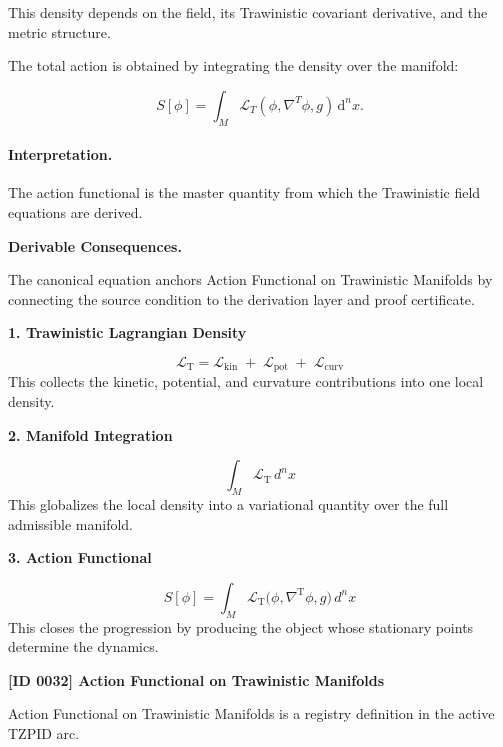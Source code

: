 This density depends on the field, its Trawinistic covariant derivative, and the metric structure.

The total action is obtained by integrating the density over the manifold:

\begin{equation}
\boxed{
S[\phi]
=
\int_M
\mathcal{L}_T
\left(
\phi,\nabla^T\phi,g
\right)
\,\mathrm{d}^n x .
}
\end{equation}

\paragraph{Interpretation.}
The action functional is the master quantity from which the Trawinistic field equations are derived.

\par\vspace{0.35em}
\noindent\textbf{Derivable Consequences.}\quad
\begingroup
\footnotesize
\raggedright
The canonical equation anchors Action Functional on Trawinistic Manifolds by connecting the source condition to the derivation layer and proof certificate.
\par\endgroup

\noindent\textbf{1. Trawinistic Lagrangian Density}\par
\[
\mathcal{L}_{\mathrm{T}}
=
\mathcal{L}_{\mathrm{kin}}
\;+\;
\mathcal{L}_{\mathrm{pot}}
\;+\;
\mathcal{L}_{\mathrm{curv}}
\]
\noindent This collects the kinetic, potential, and curvature contributions into one local density.\par
\noindent\textbf{2. Manifold Integration}\par
\[
\int_{M}\mathcal{L}_{\mathrm{T}}\,d^{n}x
\]
\noindent This globalizes the local density into a variational quantity over the full admissible manifold.\par
\noindent\textbf{3. Action Functional}\par
\[
S[\phi]
=
\int_{M}
\mathcal{L}_{\mathrm{T}}
\bigl(
\phi,\nabla^{\mathrm{T}}\phi,g
\bigr)\,
d^{n}x
\]
\noindent This closes the progression by producing the object whose stationary points determine the dynamics.\par

\clearpage
\noindent\textbf{[ID 0032] Action Functional on Trawinistic Manifolds}\par
\vspace{0.35em}
\begingroup\small
{}
Action Functional on Trawinistic Manifolds is a registry definition in the active TZPID arc.

